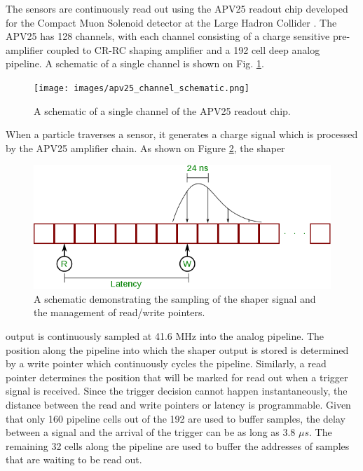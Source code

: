 The sensors are continuously read out using the APV25 readout chip developed for
the Compact Muon Solenoid detector at the Large Hadron Collider 
\cite{Raymond:2000ey}. The APV25 has 128 channels, with each channel consisting
of a charge sensitive pre-amplifier coupled to CR-RC shaping amplifier and a 192
cell deep analog pipeline.  A schematic of a single channel is shown on 
Fig. \ref{fig:apv25_schem}.
\begin{figure}
    \centering
    \texttt{[image: images/apv25\_channel\_schematic.png]}
    \caption{A schematic of a single channel of the APV25 readout chip.}
    \label{fig:apv25_schem}
\end{figure}

When a particle traverses a sensor, it generates a charge signal which is 
processed by the APV25 amplifier chain.  As shown on Figure 
\ref{fig:apv25_pipeline}, the shaper
\begin{figure}
    \centering
    \includegraphics[width=\textwidth]{images/apv25_pipeline.png}
    \caption{A schematic demonstrating the sampling of the shaper signal and
             the management of read/write pointers.}
    \label{fig:apv25_pipeline}
\end{figure}
output is continuously sampled at 41.6 MHz into the analog pipeline. The position
along the pipeline into which the shaper output is stored is determined by 
a write pointer which continuously cycles the pipeline.  Similarly, a read 
pointer determines the position that will be marked for read out when a trigger
signal is received.  Since the trigger decision cannot happen instantaneously,
the distance between the read and write pointers or latency is programmable.
Given that only 160 pipeline cells out of the 192 are used
to buffer samples, the delay between a signal and the arrival of the trigger can
be as long as 3.8 $\mu s$. The remaining 32 cells along the pipeline are used 
to buffer the addresses of samples that are waiting to be read out.

